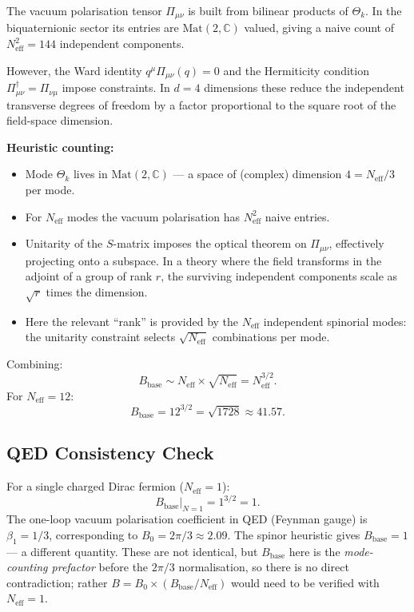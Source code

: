 \documentclass[11pt,a4paper]{article}
\theoremstyle{remark}
\begin{document}
The vacuum polarisation tensor $\Pi_{\mu\nu}$ is built from bilinear products of
$\Theta_k$.  In the biquaternionic sector its entries are $\mathrm{Mat}(2,\mathbb{C})$
valued, giving a naive count of $N_{\mathrm{eff}}^2 = 144$ independent components.

However, the Ward identity $q^\mu \Pi_{\mu\nu}(q) = 0$ and the Hermiticity
condition $\Pi_{\mu\nu}^\dagger = \Pi_{\nu\mu}$ impose constraints.  In
$d=4$ dimensions these reduce the independent transverse degrees of freedom
by a factor proportional to the square root of the field-space dimension.

\textbf{Heuristic counting:}
\begin{itemize}
  \item Mode $\Theta_k$ lives in $\mathrm{Mat}(2,\mathbb{C})$ — a space of
    (complex) dimension $4 = N_{\mathrm{eff}}/3$ per mode.
  \item For $N_{\mathrm{eff}}$ modes the vacuum polarisation has
    $N_{\mathrm{eff}}^2$ naive entries.
  \item Unitarity of the $S$-matrix imposes the optical theorem on $\Pi_{\mu\nu}$,
    effectively projecting onto a subspace.  In a theory where the field
    transforms in the adjoint of a group of rank $r$, the surviving independent
    components scale as $\sqrt{r}$ times the dimension.
  \item Here the relevant ``rank'' is provided by the $N_{\mathrm{eff}}$
    independent spinorial modes: the unitarity constraint selects
    $\sqrt{N_{\mathrm{eff}}}$ combinations per mode.
\end{itemize}

Combining:
\begin{equation}
  B_{\mathrm{base}} \sim N_{\mathrm{eff}} \times \sqrt{N_{\mathrm{eff}}}
    = N_{\mathrm{eff}}^{3/2}.
  \label{eq:B_spinor_heuristic}
\end{equation}
For $N_{\mathrm{eff}} = 12$:
\begin{equation}
  B_{\mathrm{base}} = 12^{3/2} = \sqrt{1728} \approx 41.57.
\end{equation}

\subsection{QED Consistency Check}

For a single charged Dirac fermion ($N_{\mathrm{eff}} = 1$):
\begin{equation}
  B_{\mathrm{base}}\big|_{N=1} = 1^{3/2} = 1.
\end{equation}
The one-loop vacuum polarisation coefficient in QED (Feynman gauge) is
$\beta_1 = 1/3$, corresponding to $B_0 = 2\pi/3 \approx 2.09$.
The spinor heuristic gives $B_{\mathrm{base}} = 1$ — a different quantity.
These are not identical, but $B_{\mathrm{base}}$ here is the
\emph{mode-counting prefactor} before the $2\pi/3$ normalisation, so there
is no direct contradiction; rather $B = B_0 \times (B_{\mathrm{base}}/N_{\mathrm{eff}})$
would need to be verified with $N_{\mathrm{eff}} = 1$.
\end{document}
